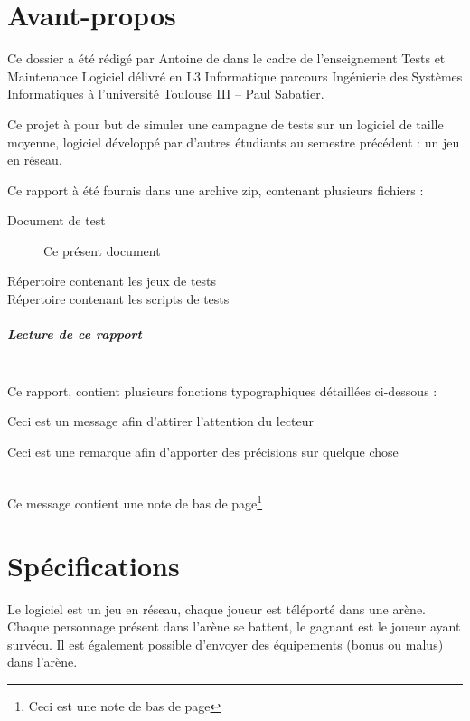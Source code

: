 \documentclass[12pt,a4paper,openany]{book}
\begin{document}
	\thispagestyle{empty} %
	\titleBC 
	\chapter*{Avant-propos}
	Ce dossier a été rédigé par Antoine de  dans le cadre de l'enseignement Tests et Maintenance Logiciel délivré en L3 Informatique parcours
	Ingénierie des Systèmes Informatiques à l'université Toulouse III -- Paul Sabatier.

	Ce projet à pour but de simuler une campagne de tests sur un logiciel de taille moyenne, logiciel développé par d'autres étudiants au semestre précédent : 
	un jeu en réseau.

	Ce rapport à été fournis dans une archive zip, contenant plusieurs fichiers : 
	\begin{description}
		\item[Document de test] Ce présent document
		\item[Répertoire contenant les jeux de tests] 
		\item[Répertoire contenant les scripts de tests] 
	\end{description}

	\paragraph{\Large Lecture de ce rapport}~\\
	Ce rapport, contient plusieurs fonctions typographiques détaillées ci-dessous : 

	\begin{attention}
		Ceci est un message afin d'attirer l'attention du lecteur	
	\end{attention}

	\begin{remarque}
		Ceci est une remarque afin d'apporter des précisions sur quelque chose\\~
	\end{remarque}

	Ce message contient une note de bas de page\footnote{Ceci est une note de bas de page}

	\tableofcontents
	\setcounter{minitocdepth}{0}
	\chapter{Spécifications}
	Le logiciel est un jeu en réseau, chaque joueur est téléporté dans une arène. Chaque personnage présent dans l'arène se battent, le gagnant est le joueur
	ayant survécu. Il est également possible d'envoyer des équipements (bonus ou malus) dans l'arène.
\end{document}
